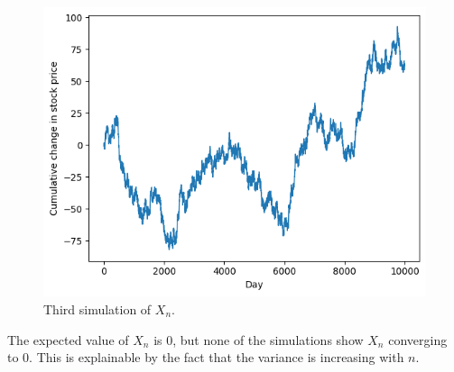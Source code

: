\begin{ex}
\begin{enumerate}[(a)]
          \begin{figure}[H]
            \centering
            \includegraphics[scale=0.8]{../images/03-11c}
            \caption{Third simulation of $X_n$.}
          \end{figure}

          The expected value of $X_n$ is $0$, but none of the simulations show
          $X_n$ converging to $0$. This is explainable by the fact that the
          variance is increasing with $n$.
  \end{enumerate}
\end{ex}

